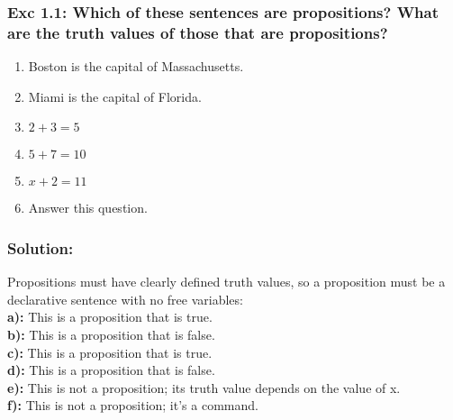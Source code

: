 \subsubsection*{Exc 1.1: Which of these sentences are propositions? What are the
truth values of those that are propositions?}
\begin{enumerate}[label=(\alph*)]
\item Boston is the capital of Massachusetts.
\item Miami is the capital of Florida.
\item $2+3=5$
\item $5+7=10$
\item $x+2 = 11$
\item Answer this question.
\end{enumerate}
\subsubsection*{Solution:}
Propositions must have clearly defined truth values, so a proposition must be a declarative sentence with no
free variables:
\\
\textbf{a):} This is a proposition that is true.
\\
\textbf{b):} This is a proposition that is false.
\\
\textbf{c):} This is a proposition that is true.
\\
\textbf{d):} This is a proposition that is false.
\\
\textbf{e):} This is not a proposition; its truth value depends on the value of x.
\\
\textbf{f):} This is not a proposition; it’s a command.
